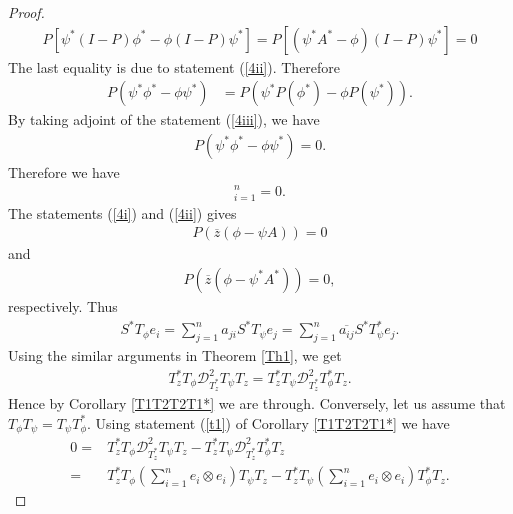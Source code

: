 \documentclass[12pt, reqno]{amsart}
\theoremstyle{definition}
\theoremstyle{remark}
\numberwithin{equation}{section}
\begin{document}
\begin{proof}
             \begin{align*}
                P[\psi^*(I-P)\phi^* - \phi(I-P)\psi^*]
                =P[(\psi^*A^*-\phi)(I-P)\psi^*]=0
            \end{align*}
            The last equality is due to statement (\ref{4ii}).
            Therefore
            \begin{align*}
                P(\psi^*\phi^* - \phi\psi^*)&=P(\psi^*P(\phi^*) - \phi P(\psi^*)).
            \end{align*}
            By taking adjoint of the statement (\ref{4iii}), we have
            \begin{align*}
                P(\psi^*\phi^* - \phi\psi^*)=0.
            \end{align*}
            Therefore we have
            \begin{align*}
                [(T^*_\psi T^*_\phi -T_\phi T^*_\psi)e_i]_{i=1}^{n}=0.
            \end{align*}
            The statements (\ref{4i}) and (\ref{4ii}) gives
            \begin{align*}
                P(\overline z(\phi-\psi A)) =0
            \end{align*}
            and
            \begin{align*}
                P(\overline z(\phi-\psi^*A^*)) =0,
            \end{align*}
            respectively.
            Thus
            \begin{align*}
                S^*T_\phi e_i = \sum_{j=1}^{n}a_{ji}S^*T_\psi e_j= \sum_{j=1}^{n}\overline{a_{ij}}S^*T_\psi^* e_j.
            \end{align*}
            Using the similar arguments in Theorem \ref{Th1}, we get
            \begin{align*}
                T_z^*T_\phi \mathcal{D}^2_{T_z^*}T_\psi T_z=T_z^*T_\psi \mathcal{D}^2_{T_z^*}T_\phi^* T_z.
            \end{align*}
            Hence by Corollary \ref{T1T2T2T1*} we are through. Conversely, let us assume that $T_\phi T_\psi =T_\psi T^*_\phi.$ Using statement (\ref{t1}) of Corollary \ref{T1T2T2T1*} we have
            \begin{align*}
               0=& T_z^*T_\phi \mathcal{D}^2_{T_z^*}T_\psi T_z-T_z^*T_\psi \mathcal{D}^2_{T_z^*}T_\phi^* T_z\\
               =&T_z^*T_\phi (\sum_{i=1}^{n} e_i\otimes e_i)T_\psi T_z-T_z^*T_\psi (\sum_{i=1}^{n} e_i\otimes e_i)T_\phi^*T_z.
            \end{align*}

\end{proof}
\end{document}
